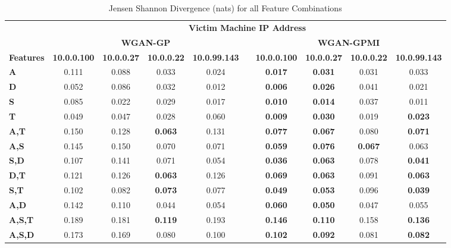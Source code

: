 \begin{table}[!htbp]
	\caption{Jensen Shannon Divergence (nats) for all Feature Combinations}
	\label{tab:jsd}
	\centering
	\begin{adjustbox}{angle=90}
		\begin{tabular}{l|c|c|c|c|c|c|c|c|c|}
			\multicolumn{1}{c|}{} & \multicolumn{9}{c|}{\textbf{Victim Machine IP Address}} \\
			\multicolumn{1}{c|}{} & \multicolumn{4}{c|}{\textbf{WGAN-GP}} &  & \multicolumn{4}{c|}{\textbf{WGAN-GPMI}} \\
			\multicolumn{1}{c|}{\textbf{Features}} & \textbf{10.0.0.100} & \textbf{10.0.0.27} & \textbf{10.0.0.22} & \textbf{10.0.99.143} & \textbf{} & \textbf{10.0.0.100} & \textbf{10.0.0.27} & \textbf{10.0.0.22} & \textbf{10.0.99.143} \\ \hline
			\textbf{A} & 0.111 & 0.088 & 0.033 & 0.024 &  & \textbf{0.017} & \textbf{0.031} & 0.031 & 0.033 \\
			\textbf{D} & 0.052 & 0.086 & 0.032 & 0.012 &  & \textbf{0.006} & \textbf{0.026} & 0.041 & 0.021 \\
			\textbf{S} & 0.085 & 0.022 & 0.029 & 0.017 &  & \textbf{0.010} & \textbf{0.014} & 0.037 & 0.011 \\
			\textbf{T} & 0.049 & 0.047 & 0.028 & 0.060 &  & \textbf{0.009} & \textbf{0.030} & 0.019 & \textbf{0.023} \\ \hline
			\textbf{A,T} & 0.150 & 0.128 & \textbf{0.063} & 0.131 &  & \textbf{0.077} & \textbf{0.067} & 0.080 & \textbf{0.071} \\
			\textbf{A,S} & 0.145 & 0.150 & 0.070 & 0.071 &  & \textbf{0.059} & \textbf{0.076} & \textbf{0.067} & 0.063 \\
			\textbf{S,D} & 0.107 & 0.141 & 0.071 & 0.054 &  & \textbf{0.036} & \textbf{0.063} & 0.078 & \textbf{0.041} \\
			\textbf{D,T} & 0.121 & 0.126 & \textbf{0.063} & 0.126 &  & \textbf{0.069} & \textbf{0.063} & 0.091 & \textbf{0.063} \\
			\textbf{S,T} & 0.102 & 0.082 & \textbf{0.073} & 0.077 &  & \textbf{0.049} & \textbf{0.053} & 0.096 & \textbf{0.039} \\
			\textbf{A,D} & 0.142 & 0.110 & 0.044 & 0.054 &  & \textbf{0.060} & \textbf{0.050} & 0.047 & 0.055 \\ \hline
			\textbf{A,S,T} & 0.189 & 0.181 & \textbf{0.119} & 0.193 &  & \textbf{0.146} & \textbf{0.110} & 0.158 & \textbf{0.136} \\
			\textbf{A,S,D} & 0.173 & 0.169 & 0.080 & 0.100 &  & \textbf{0.102} & \textbf{0.092} & 0.081 & \textbf{0.082} \\

\end{tabular}
\end{adjustbox}
\end{table}
